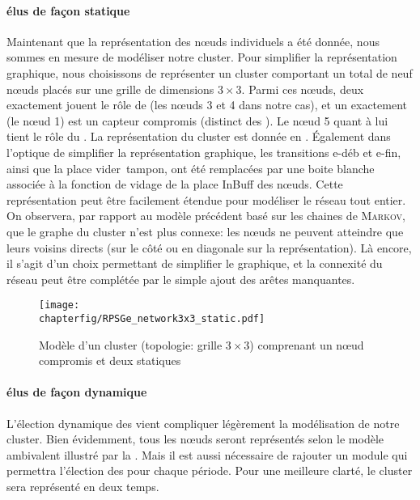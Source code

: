             \paragraph{\cns élus de façon statique}
Maintenant que la représentation des nœuds individuels a été donnée, nous sommes en mesure de modéliser notre cluster.
Pour simplifier la représentation graphique, nous choisissons de représenter un cluster comportant un total de neuf nœuds placés sur une grille de dimensions $3\times3$.
Parmi ces nœuds, deux exactement jouent le rôle de \cn (les nœuds \textsf{3} et \textsf{4} dans notre cas), et un exactement (le nœud \textsf{1}) est un capteur compromis (distinct des \cns).
Le nœud \textsf{5} quant à lui tient le rôle du \ch.
La représentation du cluster est donnée en .
Également dans l'optique de simplifier la représentation graphique, les transitions \textsf{e-déb} et \textsf{e-fin}, ainsi que la place \textsf{vider~tampon}, ont été remplacées par une boite blanche associée à la fonction de vidage de la place \textsf{InBuff} des nœuds.
Cette représentation peut être facilement étendue pour modéliser le réseau tout entier.
On observera, par rapport au modèle précédent basé sur les chaines de \textsc{Markov}, que le graphe du cluster n'est plus connexe: les nœuds ne peuvent atteindre que leurs voisins directs (sur le côté ou en diagonale sur la représentation).
Là encore, il s'agit d'un choix permettant de simplifier le graphique, et la connexité du réseau peut être complétée par le simple ajout des arêtes manquantes.
\begin{figure}[!ht]
    \centering
    \texttt{[image: \\chapterfig/RPSGe\_network3x3\_static.pdf]}
    \caption{Modèle \rpsge d'un cluster (topologie: grille $3\times3$) comprenant un nœud compromis et deux \cns statiques}\label{sa:fig:petricluster}
\end{figure}

            \paragraph{\cns élus de façon dynamique}
L'élection dynamique des \cns vient compliquer légèrement la modélisation de notre cluster.
Bien évidemment, tous les nœuds seront représentés selon le modèle ambivalent illustré par la .
Mais il est aussi nécessaire de rajouter un module qui permettra l'élection des \cns pour chaque période.
Pour une meilleure clarté, le cluster sera représenté en deux temps.

